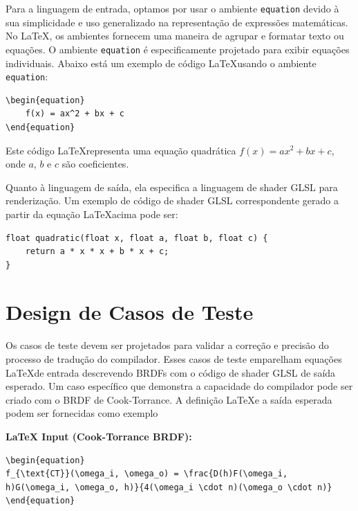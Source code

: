 \documentclass[english, 
               brazil, 
               bsc] %
               {dcomp-abntex2}
\begin{document}
Para a linguagem de entrada, optamos por usar o ambiente \texttt{equation} devido à sua simplicidade e uso generalizado na representação de expressões matemáticas. No \LaTeX , os ambientes fornecem uma maneira de agrupar e formatar texto ou equações. O ambiente \texttt{equation} é especificamente projetado para exibir equações individuais. Abaixo está um exemplo de código \LaTeX  usando o ambiente \texttt{equation}:

\begin{verbatim}
\begin{equation}
    f(x) = ax^2 + bx + c
\end{equation}
\end{verbatim}

Este código \LaTeX  representa uma equação quadrática \( f(x) = ax^2 + bx + c \), onde \( a \), \( b \) e \( c \) são coeficientes.

Quanto à linguagem de saída, ela especifica a linguagem de shader GLSL para renderização. Um exemplo de código de shader GLSL correspondente gerado a partir da equação \LaTeX  acima pode ser:

\begin{verbatim}
float quadratic(float x, float a, float b, float c) {
    return a * x * x + b * x + c;
}
\end{verbatim}

\section{Design de Casos de Teste} \label{testes}



Os casos de teste devem ser projetados para validar a correção e precisão do processo de tradução do compilador. Esses casos de teste emparelham equações \LaTeX  de entrada descrevendo BRDFs com o código de shader GLSL de saída esperado. Um caso específico que demonstra a capacidade do compilador pode ser criado com o BRDF de Cook-Torrance. A definição \LaTeX  e a saída esperada podem ser fornecidas como exemplo

\textbf{LaTeX Input (Cook-Torrance BRDF):}
\begin{verbatim}
\begin{equation}
f_{\text{CT}}(\omega_i, \omega_o) = \frac{D(h)F(\omega_i, h)G(\omega_i, \omega_o, h)}{4(\omega_i \cdot n)(\omega_o \cdot n)}
\end{equation}
\end{verbatim}
\end{document}
